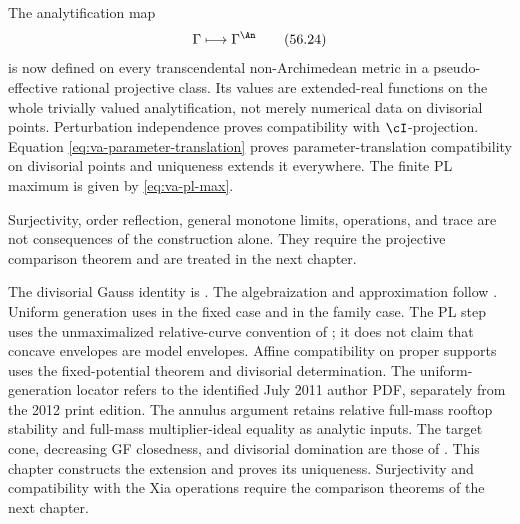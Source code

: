 The analytification map
\[
 \Gamma\longmapsto\Gamma^{\An}
\tag{56.24}\label{eq:va-an-map}
\]
is now defined on every transcendental non-Archimedean metric in a
pseudo-effective rational projective class.
Its values are extended-real functions on the whole trivially valued
analytification, not merely numerical data on divisorial points.
Perturbation independence proves compatibility with $\cI$-projection.
Equation \eqref{eq:va-parameter-translation} proves parameter-translation
compatibility on divisorial points and uniqueness extends it everywhere.
The finite PL maximum is given by \eqref{eq:va-pl-max}.

Surjectivity, order reflection, general monotone limits, operations, and
trace are not consequences of the construction alone.
They require the projective comparison theorem and are treated in the next
chapter.

\par\medskip\noindent\begin{minipage}{\linewidth}
\begin{remark}
\label{rem:va-source-boundary}
The divisorial Gauss identity is \cite[Proposition~3.1]{DXZ23}.
The algebraization and approximation follow
\cite[Lemmas~3.5 and~3.7--3.9, Proposition~3.10 and Corollary~3.11]{DXZ23}.
Uniform generation uses \cite[Theorem~6.27]{DemAMAGAuthor2011} in the fixed
case and \cite[Theorem~1.7]{Mat16} in the family case.
The PL step uses the unmaximalized relative-curve convention of
\cite[Section~2.2 and Lemma~3.2]{DXZ23}; it does not claim that concave
envelopes are model envelopes. Affine compatibility on proper supports
uses the fixed-potential theorem and divisorial determination.
The uniform-generation locator refers to the identified July 2011
author PDF, separately from the 2012 print edition.
The annulus argument retains relative full-mass rooftop stability
and full-mass multiplier-ideal equality as analytic inputs.
The target cone, decreasing GF closedness, and divisorial domination
are those of \cite[Theorems~4.5 and~4.22]{BJ22}.
This chapter constructs the extension and proves its uniqueness.
Surjectivity and compatibility with the Xia operations require the
comparison theorems of the next chapter.

\end{remark}
\end{minipage}\par\medskip

